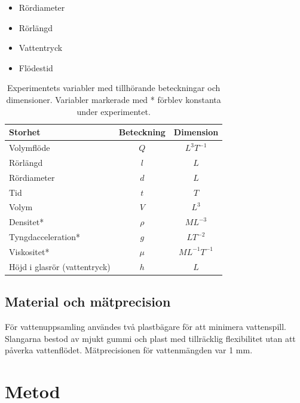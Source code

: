 \documentclass[a4paper,12pt]{article}
\begin{document}
%
\begin{itemize}
    \item Rördiameter
    \item Rörlängd
    \item Vattentryck
    \item Flödestid
\end{itemize}
%
\begin{table}[ht]
    \centering
    \begin{tabular}{|l|c|c|}
        \hline
        \textbf{Storhet} & \textbf{Beteckning} & \textbf{Dimension} \\
        \hline
        Volymflöde & $Q$ & $L^3T^{-1}$ \\
        Rörlängd & $l$ & $L$ \\
        Rördiameter & $d$ & $L$ \\
        Tid & $t$ & $T$ \\
        Volym & $V$ & $L^3$ \\
        Densitet* & $\rho$ & $ML^{-3}$ \\
        Tyngdacceleration* & $g$ & $LT^{-2}$ \\
        Viskositet* & $\mu$ & $ML^{-1}T^{-1}$ \\
        Höjd i glasrör (vattentryck) & $h$ & $L$ \\
        \hline
    \end{tabular}
    \caption{Experimentets variabler med tillhörande beteckningar och dimensioner. 
             Variabler markerade med * förblev konstanta under experimentet.}
\end{table}
%
\subsection{Material och mätprecision}
För vattenuppsamling användes två plastbägare för att minimera vattenspill. 
Slangarna bestod av mjukt gummi och plast med tillräcklig flexibilitet utan 
att påverka vattenflödet. Mätprecisionen för vattenmängden var 1 mm.
%
\section{Metod}
%
\end{document}
